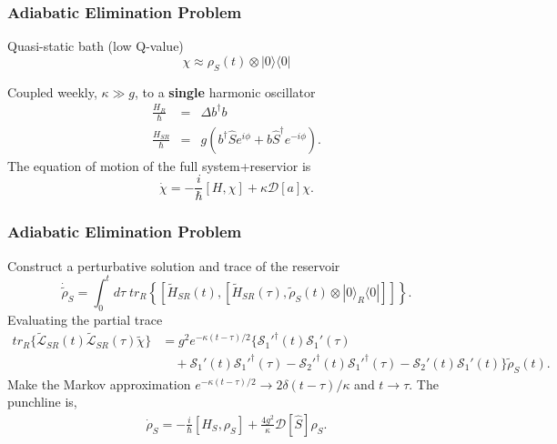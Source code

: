 \documentclass{beamer}
\begin{document}
\begin{frame}
\frametitle{Adiabatic Elimination Problem}


Quasi-static bath (low Q-value)
\begin{equation}\label{ansatz}
\chi \approx \rho_S(t) \otimes | 0 \rangle \langle 0 | \nonumber
\end{equation}

Coupled weekly, $\kappa \gg g$, to a \textbf{single} harmonic oscillator
\begin{eqnarray}\label{D_AB}
\frac{H_R}{\hbar} & = & \Delta b^{\dagger} b \nonumber \\
\frac{H_{SR}}{\hbar} & = & g \left( b^{\dagger} \hat{S} e^{i \phi } + b \hat{S}^{\dagger} e^{-i \phi} \right). 
\end{eqnarray}
The equation of motion of the full system+reservior is
\begin{equation}
\dot{\chi} = - \frac{i}{\hbar} [H , \chi] + \kappa \mathcal{D}[a]\chi.
\end{equation}

\end{frame}



\begin{frame}
\frametitle{Adiabatic Elimination Problem}
Construct a perturbative solution and trace of the reservoir
\begin{equation}
\dot{\tilde{\rho}}_S =   \int_0^t d\tau \; tr_R \left\lbrace \left[ \tilde{H}_{SR}(t) , \left[ \tilde{H}_{SR}(\tau), \tilde{\rho}_S(t) \otimes | 0 \rangle_R \langle 0 | \right] \right]  \right\rbrace. \nonumber 
\end{equation}
Evaluating the partial trace
\begin{align}\label{decay expodential}
tr_R \lbrace \mathcal{\tilde{L}}_{SR}(t) \mathcal{\tilde{L}}_{SR}(\tau) \tilde{\chi} \rbrace & =  g^2 e^{ - \kappa ( t - \tau )/ 2 } \lbrace \mathcal{S}_1'^{\dagger}(t) \mathcal{S}_1'(\tau) \nonumber \\
& \quad +  \mathcal{S}_1'(t) \mathcal{S}_1'^{\dagger}(\tau) - \mathcal{S}_2'^{\dagger}(t) \mathcal{S}_1'^{\dagger}(\tau) - \mathcal{S}_2'(t) \mathcal{S}_1'(t) \rbrace \tilde{\rho}_S(t). \nonumber 
\end{align}
Make the Markov approximation $e^{ - \kappa ( t - \tau ) / 2} \rightarrow  2 \delta( t - \tau ) / \kappa$ and $t \rightarrow \tau$. The punchline is,
\begin{eqnarray} \label{Engineered Reduced System}
 \dot{\rho}_S  =  - \frac{i}{\hbar} [H_S, \rho_S] + \frac{4 g^2}{\kappa} \mathcal{D}[\hat{S}] \rho_S. \nonumber
\end{eqnarray}
\end{frame}
\end{document}
